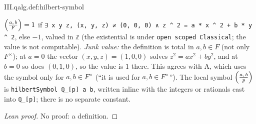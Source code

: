 \begin{definition}
\end{definition}
\begin{tfformal}{III.qalg.def:hilbert-symbol}
\begin{tffidelity}
$\Bigl(\tfrac{a,\,b}{F}\Bigr)=1$ if \texttt{∃ x y z, (x, y, z) ≠ (0, 0, 0) ∧ z \textasciicircum{} 2 = a * x \textasciicircum{} 2 + b * y \textasciicircum{} 2}, else $-1$, valued in \texttt{ℤ} (the existential is under \texttt{open scoped Classical}; the value is not computable). \emph{Junk value:} the definition is total in $a,b\in F$ (not only $F^\times$); at $a=0$ the vector $(x,y,z)=(1,0,0)$ solves $z^2=ax^2+by^2$, and at $b=0$ so does $(0,1,0)$, so the value is $1$ there. This agrees with A, which uses the symbol only for $a,b\in F^\times$ (``it is used for $a,b\in F^\times$''). The local symbol $\Bigl(\tfrac{a,\,b}{p}\Bigr)$ is \texttt{hilbertSymbol ℚ\_[p] a b}, written inline with the integers or rationals cast into \texttt{ℚ\_[p]}; there is no separate constant.
\end{tffidelity}
\end{tfformal}
\begin{proof}[Lean proof]
No proof: a definition.
\end{proof}

